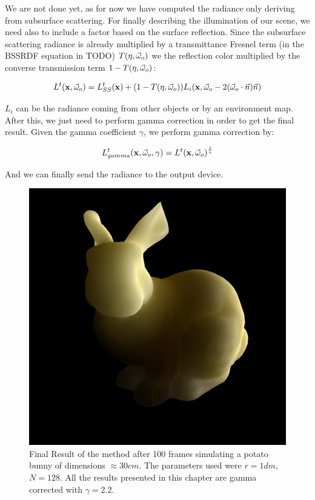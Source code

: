 We are not done yet, as for now we have computed the radiance only deriving from subsurface scattering. For finally describing the illumination of our scene, we need also to include a factor based on the surface reflection. Since the subsurface scattering radiance is already multiplied by a transmittance Fresnel term (in the BSSRDF equation in TODO) $T(\eta,\vec{\omega}_o)$ we the reflection color multiplied by the converse transmission term $1 - T(\eta,\vec{\omega}_o)$:

$$
L^t(\mathbf{x}, \vec{\omega}_o) = L_{SS}^t(\mathbf{x}) + (1 - T(\eta,\vec{\omega}_o)) L_i(\mathbf{x}, \vec{\omega}_o - 2 (\vec{\omega}_o \cdot \vec{n}) \vec{n})
$$

$L_i$ can be the radiance coming from other objects or by an environment map. After this, we just need to perform gamma correction in order to get the final result. Given the gamma coefficient $\gamma$, we perform gamma correction by:

$$
L_{gamma}^t(\mathbf{x}, \vec{\omega}_o, \gamma) = L^t(\mathbf{x},\vec{\omega}_o)^{\frac{1}{\gamma}}
$$

And we can finally send the radiance to the output device.

\begin{figure}[!ht]
\centering
\includegraphics[width=0.6 \linewidth]{images/results/potato_100_convergence.png}
\caption{Final Result of the method after 100 frames simulating a potato bunny of dimensions $\approx 30 cm$. The parameters used were $r = 1 dm$, $N = 128$. All the results presented in this chapter are gamma corrected with $\gamma = 2.2$.}
\label{fig:potato_result}
\end{figure} 

